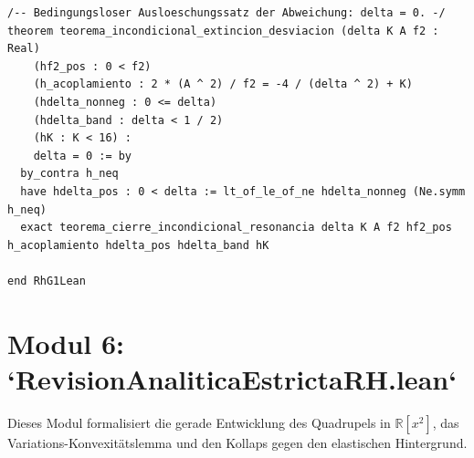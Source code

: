 \documentclass[11pt,a4paper]{article}
\theoremstyle{definition}
\theoremstyle{remark}
\begin{document}
\begin{lstlisting}[language=Lean4]
/-- Bedingungsloser Ausloeschungssatz der Abweichung: delta = 0. -/
theorem teorema_incondicional_extincion_desviacion (delta K A f2 : Real)
    (hf2_pos : 0 < f2)
    (h_acoplamiento : 2 * (A ^ 2) / f2 = -4 / (delta ^ 2) + K)
    (hdelta_nonneg : 0 <= delta)
    (hdelta_band : delta < 1 / 2)
    (hK : K < 16) :
    delta = 0 := by
  by_contra h_neq
  have hdelta_pos : 0 < delta := lt_of_le_of_ne hdelta_nonneg (Ne.symm h_neq)
  exact teorema_cierre_incondicional_resonancia delta K A f2 hf2_pos h_acoplamiento hdelta_pos hdelta_band hK

end RhG1Lean
\end{lstlisting}

\section{Modul 6: `RevisionAnaliticaEstrictaRH.lean`}

Dieses Modul formalisiert die gerade Entwicklung des Quadrupels in $\mathbb{R}[x^2]$, das Variations-Konvexitätslemma und den Kollaps gegen den elastischen Hintergrund.
\end{document}

